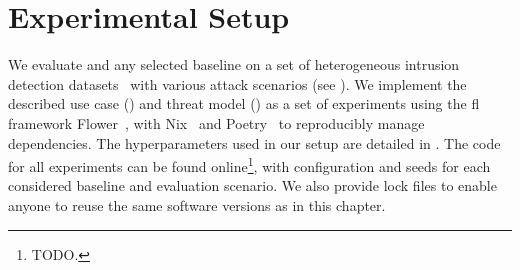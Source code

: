 \section{Experimental Setup\label{sec:radar.setup}}

We evaluate \thecontrib and any selected baseline on a set of heterogeneous intrusion detection datasets~\cite{sarhan_StandardFeatureSet_2022} with various attack scenarios (see ).
We implement the described use case () and threat model () as a set of experiments using the \gls{fl} framework Flower~\cite{beutel_Flowerfriendlyfederated_2020}, with Nix~\cite{dolstra_purelyfunctionalsoftware_2006} and Poetry~\cite{eustace_Pythondependencymanagement_2018} to reproducibly manage dependencies.
The hyperparameters used in our setup are detailed in .
The code for all experiments can be found online\footnote{TODO.}, with configuration and seeds for each considered baseline and evaluation scenario. 
We also provide lock files to enable anyone to reuse the same software versions as in this chapter.

